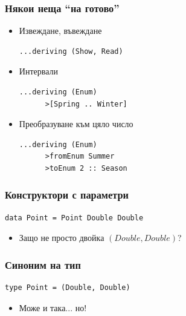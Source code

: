 \documentclass{beamer}
\begin{document}
\begin{frame}[fragile]
  \frametitle{Някои неща ``на готово''}

\begin{itemize}
  \item Извеждане, въвеждане
  \begin{lstlisting}[basicstyle=\small]
      ...deriving (Show, Read)
  \end{lstlisting}
  \item Интервали
  \begin{lstlisting}[basicstyle=\small]
      ...deriving (Enum)
      >[Spring .. Winter]
  \end{lstlisting}
  \item Преобразуване към цяло число
  \begin{lstlisting}[basicstyle=\small]
      ...deriving (Enum)
      >fromEnum Summer
      >toEnum 2 :: Season
  \end{lstlisting}
\end{itemize}

\end{frame}

\begin{frame}[fragile]
  \frametitle{Конструктори с параметри}

  \begin{lstlisting}[basicstyle=\small]
    data Point = Point Double Double
  \end{lstlisting}

\begin{itemize}
  \item Защо не просто двойка $(Double, Double)$?
\end{itemize}

\end{frame}


\begin{frame}[fragile]
  \frametitle{Синоним на тип}

  \begin{lstlisting}[basicstyle=\small]
    type Point = (Double, Double)
  \end{lstlisting}

\begin{itemize}
  \item Може и така... но!
\end{itemize}

\end{frame}
\end{document}
